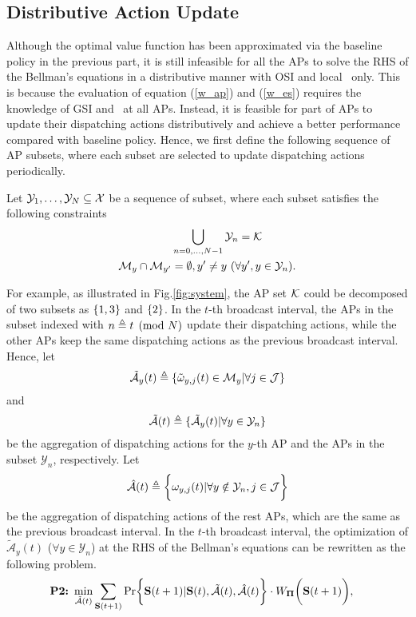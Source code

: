 \subsection{Distributive Action Update}
\label{subsec:ap_alg}
Although the optimal value function has been approximated via the baseline policy in the previous part, it is still infeasible for all the APs to solve the RHS of the Bellman's equations in a distributive manner with OSI and local \brlatency~only.
This is because the evaluation of equation (\ref{w_ap}) and (\ref{w_es}) requires the knowledge of GSI and \brlatency~at all APs.
Instead, it is feasible for part of APs to update their dispatching actions distributively and achieve a better performance compared with baseline policy.
Hence, we first define the following sequence of AP subsets, where each subset are selected to update dispatching actions periodically.
\begin{definition}
    Let $\mathcal{Y}_{1}, \dots, \mathcal{Y}_{N} \subseteq \mathcal{X}$ be a sequence of subset, where each subset satisfies the following constraints
    \begin{align}
        &\bigcup_{n=0,\dots,N-1} \mathcal{Y}_{n} = \mathcal{K}
        \\
        \mathcal{M}_{y} \cap \mathcal{M}_{y'} &=\emptyset, y' \neq y~(\forall y',y \in \mathcal{Y}_{n}).
    \end{align}
\end{definition}
For example, as illustrated in Fig.\ref{fig:system}, the AP set $\mathcal{K}$ could be decomposed of two subsets as $\{1,3\}$ and $\{2\}$.
In the $t$-th broadcast interval, the APs in the subset indexed with $n \triangleq t \pmod{N}$ update their dispatching actions, while the other APs keep the same dispatching actions as the previous broadcast interval.
Hence, let 
\begin{align}
    \tilde{\mathcal{A}}_{y}(t) \triangleq \{\tilde{\omega}_{y,j}(t)\in \mathcal{M}_{y}|\forall j\in\mathcal{J}\}
\end{align}
and 
\begin{align}
    \tilde{\mathcal{A}}(t) \triangleq \{\tilde{\mathcal{A}}_{y}(t) | \forall y\in\mathcal{Y}_{n} \}
\end{align}
be the aggregation of dispatching actions for the $y$-th AP and the APs in the subset $\mathcal{Y}_{n}$, respectively. Let
\begin{align}
    \hat{\mathcal{A}}(t) \triangleq \bigg\{\omega_{y,j}(t) | \forall y\notin\mathcal{Y}_{n}, j\in\mathcal{J}\bigg\}
\end{align}
be the aggregation of dispatching actions of the rest APs, which are the same as the previous broadcast interval.
In the $t$-th broadcast interval, the optimization of $\tilde{\mathcal{A}}_{y}(t)$ ($\forall y\in\mathcal{Y}_{n}$) at the RHS of the Bellman's equations can be rewritten as the following problem.
{\small
\begin{align}
    \textbf{P2:}~
    \min_{ \tilde{\mathcal{A}}(t) }
    &\sum_{\Stat(t+1)} \Pr\Brace{
        \Stat(t+1) | \Stat(t), \tilde{\mathcal{A}}(t), \hat{\mathcal{A}}(t)
    } \cdot W_{\Baseline}\Paren{\Stat(t+1)},
\end{align}
}

